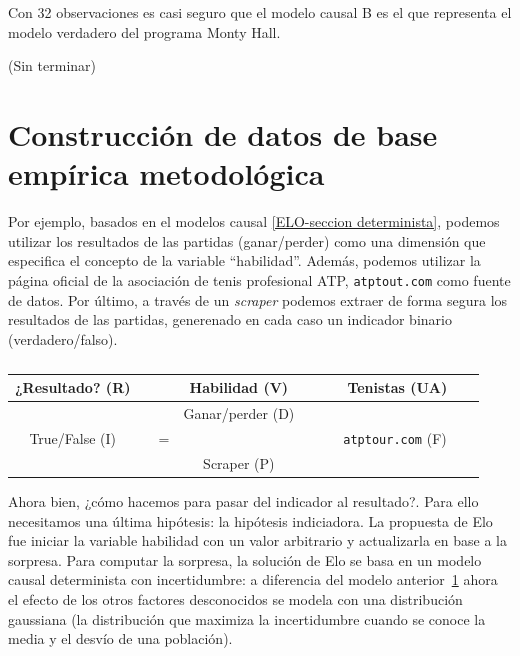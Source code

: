 \documentclass[a4paper,10pt]{book}
\theoremstyle{definition}
\begin{document}
Con 32 observaciones es casi seguro que el modelo causal B es el que representa el modelo verdadero del programa Monty Hall.

(Sin terminar)

\section{Construcción de datos de base empírica metodológica}


Por ejemplo, basados en el modelos causal \ref{ELO-seccion determinista}, podemos utilizar los resultados de las partidas (ganar/perder) como una dimensión que especifica el concepto de la variable ``habilidad''.
Además, podemos utilizar la página oficial de la asociación de tenis profesional ATP, \texttt{atptout.com} como fuente de datos.
Por último, a través de un \emph{scraper} podemos extraer de forma segura los resultados de las partidas, generenado en cada caso un indicador binario (verdadero/falso).


\begin{table}[ht!]
\centering
\begin{tabular}{clcccc}
¿Resultado? (R) & \multicolumn{1}{r|}{} &  & Habilidad (V) &  &  \multicolumn{1}{|c}{Tenistas (UA)} \\ \hline
   &  \multicolumn{1}{r|}{}    &  & Ganar/perder (D) &  & \multicolumn{1}{|r}{} \\
                 True/False (I)  &   & =  &  &  & \ \ \ \texttt{atptour.com} (F) \ \ \  \\
 & \multicolumn{1}{r|}{} &  & Scraper (P) &        &      \multicolumn{1}{|r}{}
\end{tabular}
\caption{}
\label{tab:operacionalizacion_habilidad}
\end{table}


Ahora bien, ¿cómo hacemos para pasar del indicador al resultado?.
Para ello necesitamos una última hipótesis: la hipótesis indiciadora.
La propuesta de Elo fue iniciar la variable habilidad con un valor arbitrario y actualizarla en base a la sorpresa.
Para computar la sorpresa, la solución de Elo se basa en un modelo causal determinista con incertidumbre: a diferencia del modelo anterior~\ref{} ahora el efecto de los otros factores desconocidos se modela con una distribución gaussiana (la distribución que maximiza la incertidumbre cuando se conoce la media y el desvío de una población).
\end{document}
